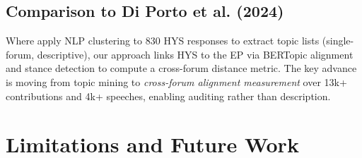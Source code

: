 \documentclass[sigconf,natbib]{acmart}
\begin{document}
\subsection{Comparison to Di Porto et al. (2024)}

Where \citet{DiPorto2024} apply NLP clustering to 830 HYS responses to extract topic lists (single-forum, descriptive), our approach links HYS to the EP via BERTopic alignment and stance detection to compute a cross-forum distance metric. The key advance is moving from topic mining to \emph{cross-forum alignment measurement} over 13k+ contributions and 4k+ speeches, enabling auditing rather than description.

\section{Limitations and Future Work}
\end{document}
